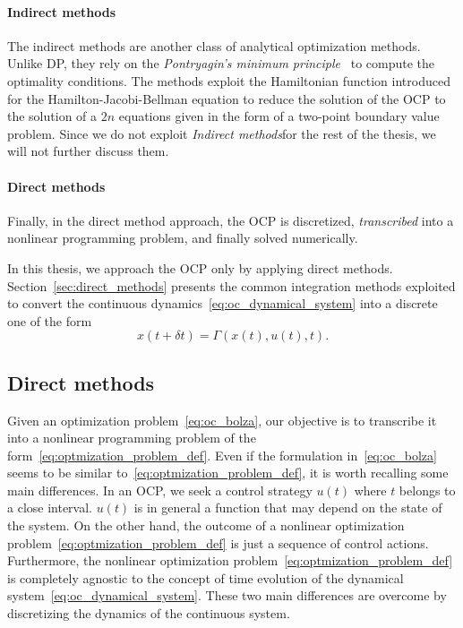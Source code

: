 \paragraph{Indirect methods}
The indirect methods are another class of analytical optimization methods. Unlike DP, they rely on the \emph{Pontryagin’s minimum principle}~\citep[Section~5.3]{kirk2012optimal} to compute the optimality conditions. The methods exploit the Hamiltonian function introduced for the Hamilton-Jacobi-Bellman equation to reduce the solution of the OCP to the solution of a $2n$ equations given in the form of a two-point boundary value problem. Since we do not exploit \emph{Indirect methods}for the rest of the thesis, we will not further discuss them.
\paragraph{Direct methods}
Finally, in the direct method approach, the OCP is discretized, \emph{transcribed} into a nonlinear programming problem, and finally solved numerically. 
\par
In this thesis, we approach the OCP only by applying direct methods. Section~\ref{sec:direct_methods} presents the common integration methods exploited to convert the continuous dynamics~\eqref{eq:oc_dynamical_system} into a discrete one of the form
\begin{equation}
    x(t+\delta t) = \Gamma(x(t), u(t), t).
\end{equation}

\subsection{Direct methods\label{sec:direct_methods}}
Given an optimization problem~\eqref{eq:oc_bolza}, our objective is to transcribe it into a nonlinear programming problem of the form~\eqref{eq:optmization_problem_def}. Even if the formulation in~\eqref{eq:oc_bolza} seems to be similar to~\eqref{eq:optmization_problem_def}, it is worth recalling some main differences. In an OCP, we seek a control strategy $u(t)$ where $t$ belongs to a close interval. $u(t)$ is in general a function that may depend on the state of the system. On the other hand, the outcome of a nonlinear optimization problem~\eqref{eq:optmization_problem_def} is just a sequence of control actions. Furthermore, the nonlinear optimization problem~\eqref{eq:optmization_problem_def} is completely agnostic to the concept of time evolution of the dynamical system~\eqref{eq:oc_dynamical_system}. These two main differences are overcome by discretizing the dynamics of the continuous system.

